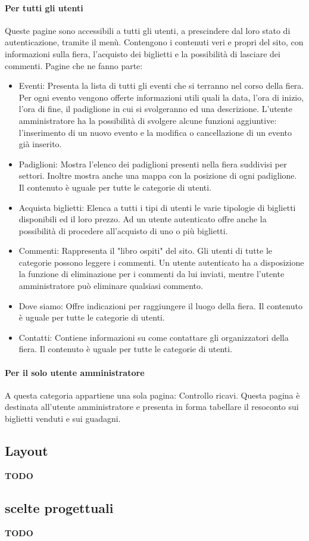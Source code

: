 \paragraph{Per tutti gli utenti}
Queste pagine sono accessibili a tutti gli utenti, a prescindere dal loro stato di autenticazione, tramite il menù.
Contengono i contenuti veri e propri del sito, con informazioni sulla fiera, l'acquisto dei biglietti e la possibilità di lasciare dei commenti.
Pagine che ne fanno parte:
\begin{itemize}
	\item Eventi:
		Presenta la lista di tutti gli eventi che si terranno nel corso della fiera. Per ogni evento vengono offerte informazioni utili quali la data, l'ora di inizio, l'ora di fine, il padiglione in cui si svolgeranno ed una descrizione.
		L'utente amministratore ha la possibilità di svolgere alcune funzioni aggiuntive: l'inserimento di un nuovo evento e la modifica o cancellazione di un evento già inserito.
	\item Padiglioni:
		Mostra l'elenco dei padiglioni presenti nella fiera suddivisi per settori. Inoltre mostra anche una mappa con la posizione di ogni padiglione. Il contenuto è uguale per tutte le categorie di utenti.
	\item Acquista biglietti:
		Elenca a tutti i tipi di utenti le varie tipologie di biglietti disponibili ed il loro prezzo. Ad un utente autenticato offre anche la possibilità di procedere all'acquisto di uno o più biglietti.
	\item Commenti:
		Rappresenta il "libro ospiti" del sito. Gli utenti di tutte le categorie possono leggere i commenti. Un utente autenticato ha a disposizione la funzione di eliminazione per i commenti da lui inviati, mentre l'utente amministratore può eliminare qualsiasi commento.
	\item Dove siamo:
		Offre indicazioni per raggiungere il luogo della fiera. Il contenuto è uguale per tutte le categorie di utenti.
	\item Contatti:
		Contiene informazioni su come contattare gli organizzatori della fiera. Il contenuto è uguale per tutte le categorie di utenti.
\end{itemize}

\paragraph{Per il solo utente amministratore}
A questa categoria appartiene una sola pagina: Controllo ricavi.
Questa pagina è destinata all'utente amministratore e presenta in forma tabellare il resoconto sui biglietti venduti e sui guadagni.

\subsection{Layout}
\textbf{TODO}

\subsection{scelte progettuali}
\textbf{TODO}

	